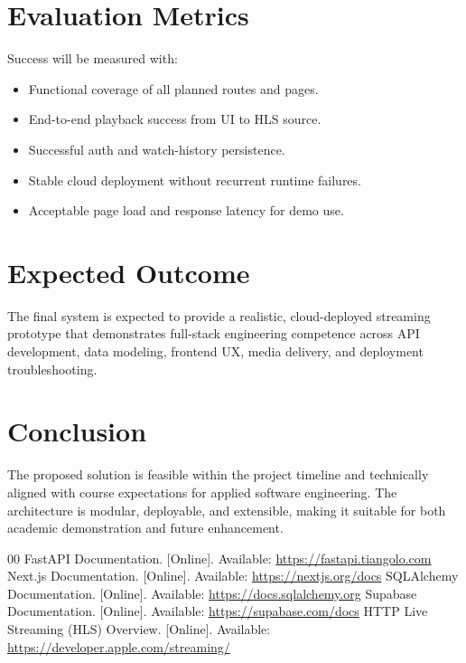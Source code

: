 \documentclass[conference]{IEEEtran}
\begin{document}
\section{Evaluation Metrics}
Success will be measured with:
\begin{itemize}
\item Functional coverage of all planned routes and pages.
\item End-to-end playback success from UI to HLS source.
\item Successful auth and watch-history persistence.
\item Stable cloud deployment without recurrent runtime failures.
\item Acceptable page load and response latency for demo use.
\end{itemize}

\section{Expected Outcome}
The final system is expected to provide a realistic, cloud-deployed streaming prototype that demonstrates full-stack engineering competence across API development, data modeling, frontend UX, media delivery, and deployment troubleshooting.

\section{Conclusion}
The proposed solution is feasible within the project timeline and technically aligned with course expectations for applied software engineering. The architecture is modular, deployable, and extensible, making it suitable for both academic demonstration and future enhancement.

\begin{thebibliography}{00}
 FastAPI Documentation. [Online]. Available: \url{https://fastapi.tiangolo.com}
 Next.js Documentation. [Online]. Available: \url{https://nextjs.org/docs}
 SQLAlchemy Documentation. [Online]. Available: \url{https://docs.sqlalchemy.org}
 Supabase Documentation. [Online]. Available: \url{https://supabase.com/docs}
 HTTP Live Streaming (HLS) Overview. [Online]. Available: \url{https://developer.apple.com/streaming/}
\end{thebibliography}
\end{document}
